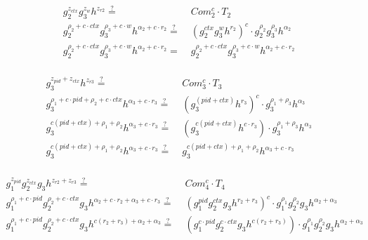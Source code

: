 \[
    \begin{aligned}
      g_2^{z_{ctx}} g_3^{z_{w}} h^{z_{r2}} \stackrel{?}{=}& \; Com_2^c \cdot T_2 \\
      g_2^{\rho_2 + c \cdot ctx} g_3^{\rho_3 + c \cdot w} h^{\alpha_2 + c \cdot r_2} \stackrel{?}{=}& \; (g_2^{ctx}g_3^{w} h^{r_2})^c \cdot g_2^{\rho_2} g_3^{\rho_3} h^{\alpha_2} \\
      g_2^{\rho_2 + c \cdot ctx} g_3^{\rho_3 + c \cdot w} h^{\alpha_2 + c \cdot r_2} \stackrel{}{=}& \; g_2^{\rho_2 + c \cdot ctx} g_3^{\rho_3 + c \cdot w} h^{\alpha_2 + c \cdot r_2} \\
    \end{aligned}
\]

\[
    \begin{aligned}
      g_3^{z_{pid} + z_{ctx}} h^{z_{r3}} \stackrel{?}{=}& \; Com_3^c \cdot T_3 \\
      g_3^{\rho_1 + c \cdot pid + \rho_2 + c \cdot ctx} h^{\alpha_3 + c \cdot r_3} \stackrel{?}{=}& \; (g_3^{(pid + ctx)}h^{r_3})^c  \cdot g_3^{\rho_1 + \rho_3} h^{\alpha_3} \\
      g_3^{c (pid + ctx) + \rho_1 + \rho_2} h^{\alpha_3 + c \cdot r_3} \stackrel{?}{=}& \; (g_3^{c(pid + ctx)}h^{c \cdot r_3})  \cdot g_3^{\rho_1 + \rho_3} h^{\alpha_3} \\
      g_3^{c (pid + ctx) + \rho_1 + \rho_2} h^{\alpha_3 + c \cdot r_3} \stackrel{?}{=}& \; g_3^{c (pid + ctx) + \rho_1 + \rho_2} h^{\alpha_3 + c \cdot r_3} \\
    \end{aligned}
\]

\[
    \begin{aligned}
      g_1^{z_{pid}} g_2^{z_{ctx}} g_3 h^{z_{r2} + z_{r3}} \stackrel{?}{=}& \; Com_4^c \cdot T_4 \\
      g_1^{\rho_1 + c \cdot pid} g_2^{\rho_2 + c \cdot ctx} g_3 h^{\alpha_2 + c \cdot r_2 + \alpha_3 + c \cdot r_3} \stackrel{?}{=}& \; (g_1^{pid}g_2^{ctx}g_3h^{r_2 + r_3})^c \cdot g_1^{\rho_1}g_2^{\rho_2}g_3h^{\alpha_2 + \alpha_3}\\
      g_1^{\rho_1 + c \cdot pid} g_2^{\rho_2 + c \cdot ctx} g_3 h^{c (r_2 + r_3) + \alpha_2 + \alpha_3 } \stackrel{?}{=}& \; (g_1^{c \cdot pid}g_2^{c \cdot ctx}g_3h^{c (r_2 + r_3)}) \cdot g_1^{\rho_1}g_2^{\rho_2}g_3h^{\alpha_2 + \alpha_3}\\
    \end{aligned}
\]

